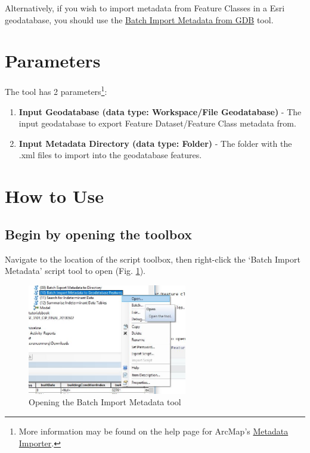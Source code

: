 \documentclass[openany]{book}
\providecommand{\tightlist}{%
  \setlength{\itemsep}{0pt}\setlength{\parskip}{0pt}}
\let\rmarkdownfootnote\footnote%
\def\footnote{\protect\rmarkdownfootnote}
\theoremstyle{definition}
\theoremstyle{definition}
\theoremstyle{definition}
\theoremstyle{remark}
\begin{document}
Alternatively, if you wish to import metadata from Feature Classes in a
Esri geodatabase, you should use the \protect\hyperlink{imMetaGDB}{Batch
Import Metadata from GDB} tool.

\section{Parameters}\label{parameters-11}

The tool has 2 parameters\footnote{More information may be found on the
  help page for ArcMap's
  \href{http://desktop.arcgis.com/en/arcmap/latest/tools/conversion-toolbox/metadata-importer.htm}{Metadata
  Importer}.}:

\begin{enumerate}
\def\labelenumi{\arabic{enumi}.}
\tightlist
\item
  \textbf{Input Geodatabase (data type: Workspace/File Geodatabase)} -
  The input geodatabase to export Feature Dataset/Feature Class metadata
  from.
\item
  \textbf{Input Metadata Directory (data type: Folder)} - The folder
  with the .xml files to import into the geodatabase features.
\end{enumerate}

\section{How to Use}\label{how-to-use-11}

\subsection{Begin by opening the
toolbox}\label{begin-by-opening-the-toolbox-11}

Navigate to the location of the script toolbox, then right-click the
`Batch Import Metadata' script tool to open (Fig. \ref{fig:imMetaopen}).

\begin{figure}[H]

{\centering \includegraphics[width=2.74in,]{figures/imMeta-open} 

}

\caption{Opening the Batch Import Metadata tool}\label{fig:imMetaopen}
\end{figure}
\end{document}
